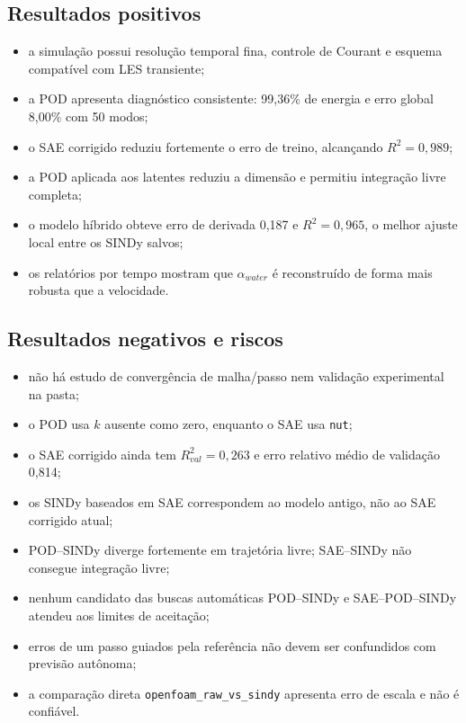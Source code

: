 \documentclass[12pt,a4paper]{article}
\newcommand{\code}[1]{\texttt{#1}}
\begin{document}
\subsection*{Resultados positivos}
\begin{itemize}
  \item a simulação possui resolução temporal fina, controle de Courant e esquema compatível com LES transiente;
  \item a POD apresenta diagnóstico consistente: 99,36\% de energia e erro global 8,00\% com 50 modos;
  \item o SAE corrigido reduziu fortemente o erro de treino, alcançando $R^2=0,989$;
  \item a POD aplicada aos latentes reduziu a dimensão e permitiu integração livre completa;
  \item o modelo híbrido obteve erro de derivada 0,187 e $R^2=0,965$, o melhor ajuste local entre os SINDy salvos;
  \item os relatórios por tempo mostram que $\alpha_{water}$ é reconstruído de forma mais robusta que a velocidade.
\end{itemize}

\subsection*{Resultados negativos e riscos}
\begin{itemize}
  \item não há estudo de convergência de malha/passo nem validação experimental na pasta;
  \item o POD usa $k$ ausente como zero, enquanto o SAE usa \code{nut};
  \item o SAE corrigido ainda tem $R^2_{val}=0,263$ e erro relativo médio de validação 0,814;
  \item os SINDy baseados em SAE correspondem ao modelo antigo, não ao SAE corrigido atual;
  \item POD--SINDy diverge fortemente em trajetória livre; SAE--SINDy não consegue integração livre;
  \item nenhum candidato das buscas automáticas POD--SINDy e SAE--POD--SINDy atendeu aos limites de aceitação;
  \item erros de um passo guiados pela referência não devem ser confundidos com previsão autônoma;
  \item a comparação direta \code{openfoam\_raw\_vs\_sindy} apresenta erro de escala e não é confiável.
\end{itemize}
\end{document}
